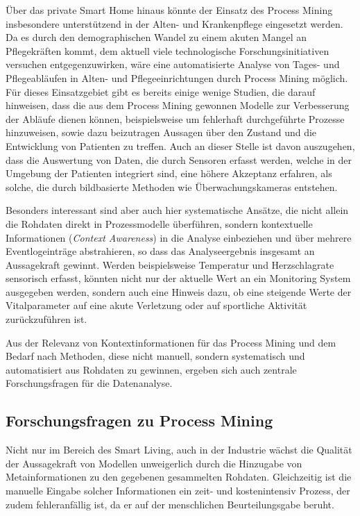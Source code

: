 Über das private Smart Home hinaus könnte der Einsatz des Process Mining insbesondere unterstützend in der Alten- und Krankenpflege eingesetzt werden. Da es durch den demographischen Wandel zu einem akuten Mangel an Pflegekräften kommt, dem aktuell viele technologische Forschungsinitiativen versuchen entgegenzuwirken, wäre eine automatisierte Analyse von Tages- und Pflegeabläufen in Alten- und Pflegeeinrichtungen durch Process Mining möglich. Für dieses Einsatzgebiet gibt es bereits einige wenige Studien, die darauf hinweisen, dass die aus dem Process Mining gewonnen Modelle zur Verbesserung der Abläufe dienen können, beispielsweise um fehlerhaft durchgeführte Prozesse hinzuweisen, sowie dazu beizutragen Aussagen über den Zustand und die Entwicklung von Patienten zu treffen. Auch an dieser Stelle ist davon auszugehen, dass die Auswertung von Daten, die durch Sensoren erfasst werden, welche in der Umgebung der Patienten integriert sind, eine höhere Akzeptanz erfahren, als solche, die durch bildbasierte Methoden wie Überwachungskameras entstehen.

Besonders interessant sind aber auch hier systematische Ansätze, die nicht allein die Rohdaten direkt in Prozessmodelle überführen, sondern kontextuelle Informationen (\textit{Context Awareness}) in die Analyse einbeziehen und über mehrere Eventlogeinträge abstrahieren, so dass das Analyseergebnis insgesamt an Aussagekraft gewinnt.
Werden beispielsweise Temperatur und Herzschlagrate sensorisch erfasst, könnten nicht nur der aktuelle Wert an ein Monitoring System ausgegeben werden, sondern auch eine Hinweis dazu, ob eine steigende Werte der Vitalparameter auf eine akute Verletzung oder auf sportliche Aktivität zurückzuführen ist.

Aus der Relevanz von Kontextinformationen für das Process Mining und dem Bedarf nach Methoden, diese nicht manuell, sondern systematisch und automatisiert aus Rohdaten zu gewinnen, ergeben sich auch zentrale Forschungsfragen für die Datenanalyse.

\subsection{Forschungsfragen zu Process Mining}
Nicht nur im Bereich des Smart Living, auch in der Industrie wächst die Qualität der Aussagekraft von Modellen unweigerlich durch die Hinzugabe von Metainformationen zu den gegebenen gesammelten Rohdaten. Gleichzeitig ist die manuelle Eingabe solcher Informationen ein zeit- und kostenintensiv Prozess, der zudem fehleranfällig ist, da er auf der menschlichen Beurteilungsgabe beruht.

